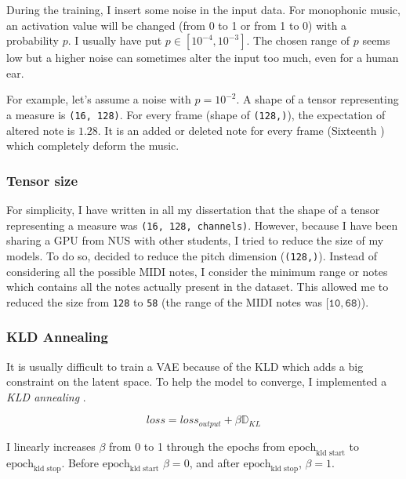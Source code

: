 \documentclass[12pt]{report}
\begin{document}
During the training, I insert some noise in the input data.
For monophonic music, an activation value will be changed (from 0 to 1 or from 1 to 0) with a probability $p$.
I usually have put $p \in [10^{-4}, 10^{-3}]$.
The chosen range of $p$ seems low but a higher noise can sometimes alter the input too much, even for a human ear.

For example, let's assume a noise with $p = 10^{-2}$.
A shape of a tensor representing a measure is \texttt{(16, 128)}.
For every frame (shape of \texttt{(128,)}), the expectation of altered note is $1.28$.
It is an added or deleted note for every frame (Sixteenth \musSixteenth) which completely deform the music.

\subsubsection{Tensor size}

For simplicity, I have written in all my dissertation that the shape of a tensor representing a measure was \texttt{(16, 128, channels)}.
However, because I have been sharing a GPU from NUS with other students, I tried to reduce the size of my models.
To do so, decided to reduce the pitch dimension (\texttt{(128,)}).
Instead of considering all the possible MIDI notes, I consider the minimum range or notes which contains all the notes actually present in the dataset.
This allowed me to reduced the size from \texttt{128} to \texttt{58} (the range of the MIDI notes was $[\texttt{10}, \texttt{68})$).


\subsubsection{KLD Annealing}
\label{appendix:kld-annealing}

It is usually difficult to train a VAE because of the KLD which adds a big constraint on the latent space.
To help the model to converge, I implemented a \textit{KLD annealing} \cite{huang_improving_2018}.

\begin{equation}
    loss = loss_{output} + \beta \mathbb{D}_{KL}
\end{equation}

I linearly increases $\beta$ from 0 to 1 through the epochs from $\text{epoch}_{\text{kld start}}$ to $\text{epoch}_{\text{kld stop}}$.
Before $\text{epoch}_{\text{kld start}}$ $\beta = 0$, and after $\text{epoch}_{\text{kld stop}}$, $\beta = 1$.
\end{document}
